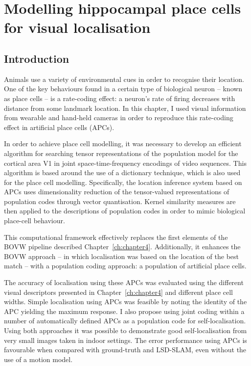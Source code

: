 \chapter{Modelling hippocampal place cells for visual localisation}\label{ch:chapter5} %


\section{Introduction}

Animals use a variety of environmental cues in order to recognise their location.  One of the key behaviours found in a certain type of biological neuron -- known as place cells -- is a rate-coding effect: a neuron's rate of firing decreases with distance from some landmark location. In this chapter, I used visual information from wearable and hand-held cameras in order to reproduce this rate-coding effect in artificial place cells (APCs). 

In order to achieve place cell modelling, it was necessary to develop an efficient algorithm for searching tensor representations of the population model for the cortical area V1 in joint space-time-frequency encodings of video sequences.  This algorithm is based around the use of a dictionary technique, which is also used for the place cell modelling. Specifically, the location inference system based on APCs uses  dimensionality reduction of the tensor-valued representations of  population codes through vector quantisation.  Kernel similarity measures are then applied to the descriptions of population codes in order to mimic biological place-cell behaviour. 

This computational framework effectively replaces the first elements of the BOVW pipeline described Chapter~\ref{ch:chapter4}. Additionally, it enhances the BOVW approach  -- in which localisation was based on the location of the best match -- with a population coding approach: a population of artificial place cells. 

The accuracy of localisation using these APCs was evaluated using the different visual descriptors presented in Chapter~\ref{ch:chapter4} and different place cell widths. Simple localisation using APCs was feasible by noting the identity of the APC yielding the maximum response. I also propose using joint coding within a number of automatically defined APCs as a population code for self-localisation. Using both approaches it was possible to demonstrate good self-localisation from very small images taken in indoor settings. The error performance using APCs is favourable when compared with ground-truth and LSD-SLAM, even without the use of a motion model.


